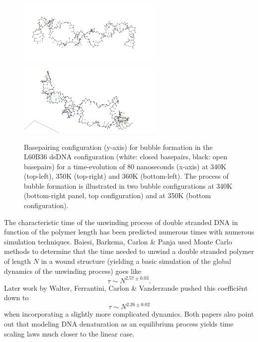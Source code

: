 \begin{figure}[hbt] \begin{minipage}{7cm}
 \end{minipage} \begin{minipage}{7cm}  \end{minipage}
\begin{minipage}{8cm}
 \end{minipage} \begin{minipage}{6cm}
\includegraphics[width=7cm]{images/L60B36_bubble2.png}\\
\includegraphics[width=7cm]{images/L60B36_bubble1.png} \end{minipage}
\begin{center}
\caption{Basepairing configuration (y-axis) for bubble formation in the L60B36 dsDNA configuration (white: closed basepairs, black: open basepairs) for a time-evolution of 80 nanoseconds (x-axis) at 340K (top-left), 350K (top-right) and 360K (bottom-left). The process of bubble formation is illustrated in two bubble configurations at 340K (bottom-right panel, top configuration) and at 350K (bottom configuration). }\label{L60B36_configs}
\end{center}
\end{figure}

The characteristic time of the unwinding process of double stranded DNA in function of the polymer length has been predicted numerous times with numerous simulation techniques. Baiesi, Barkema, Carlon \& Panja \cite{carlon2010unwinding} used Monte Carlo methods to determine that the time needed to unwind a double stranded polymer of length $N$ in a wound structure (yielding a basic simulation of the global dynamics of the unwinding process) goes like
\begin{equation}
\tau \sim N^{2.57\pm 0.03}.
\end{equation}
Later work by Walter, Ferrantini, Carlon \& Vanderzande \cite{walter2011fractional} pushed this coeffici\"ent down to 
\begin{equation}
\tau \sim N^{2.26 \pm 0.02}
\end{equation}
when incorporating a slightly more complicated dynamics. Both papers also point out that modeling DNA denaturation as an equilibrium process yields time scaling laws much closer to the linear case.


